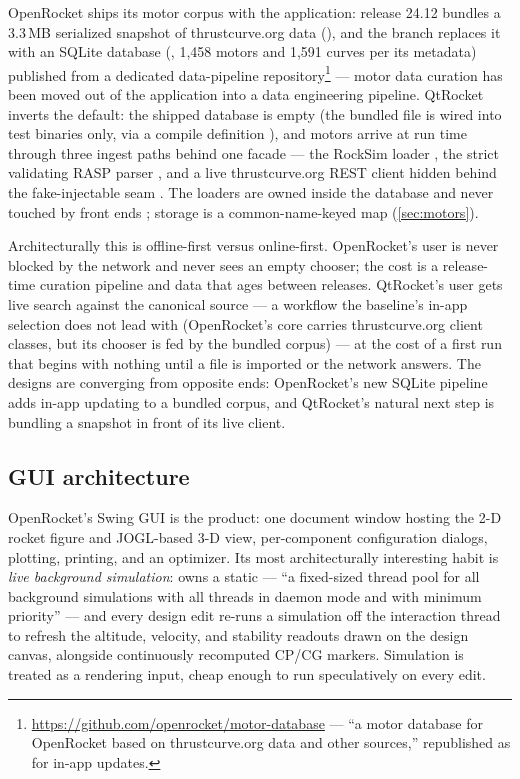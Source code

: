 OpenRocket ships its motor corpus with the application: release 24.12 bundles a 3.3\,MB
serialized snapshot of thrustcurve.org data (), and the
 branch replaces it with an SQLite database
(, 1,458 motors and 1,591 curves per its metadata) published
from a dedicated data-pipeline repository\footnote{\url{https://github.com/openrocket/motor-database}
--- ``a motor database for OpenRocket based on thrustcurve.org data and other sources,''
republished as  for in-app updates.} --- motor data curation has been
moved out of the application into a data engineering pipeline. QtRocket inverts the
default: the shipped database is empty (the bundled  file is wired into test
binaries only, via a compile definition ), and motors arrive
at run time through three ingest paths behind one facade --- the RockSim  loader
, the strict validating RASP  parser
, and a live thrustcurve.org REST client hidden behind the
fake-injectable  seam . The
loaders are owned inside the database and never touched by front ends
; storage is a common-name-keyed map
 (\cref{sec:motors}).

Architecturally this is offline-first versus online-first. OpenRocket's user is never
blocked by the network and never sees an empty chooser; the cost is a release-time curation
pipeline and data that ages between releases. QtRocket's user gets live search against the
canonical source --- a workflow the baseline's in-app selection does not lead with
(OpenRocket's core carries thrustcurve.org client classes, but its chooser is fed by the
bundled corpus) --- at the cost
of a first run that begins with nothing until a file is imported or the network answers.
The designs are converging from opposite ends: OpenRocket's new SQLite pipeline adds
in-app updating to a bundled corpus, and QtRocket's natural next step is bundling a
snapshot in front of its live client.

\subsection{GUI architecture}\label{app:or-architecture-gui}

OpenRocket's Swing GUI is the product: one document window hosting the 2-D rocket figure
and JOGL-based 3-D view, per-component configuration dialogs, plotting, printing, and an
optimizer. Its most architecturally interesting habit is \emph{live background simulation}:
 owns a static  --- ``a fixed-sized thread pool for
all background simulations with all threads in daemon mode and with minimum priority'' ---
and every design edit re-runs a simulation off the interaction thread to refresh the
altitude, velocity, and stability readouts drawn on the design canvas, alongside
continuously recomputed CP/CG markers. Simulation is treated as a rendering input, cheap
enough to run speculatively on every edit.

